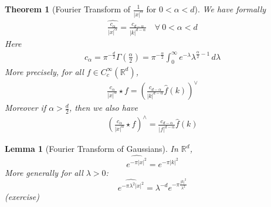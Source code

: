 \documentclass{report}
\theoremstyle{tommy}
\newtheorem{thm}[defn]{Theorem}
\newtheorem{lem}[defn]{Lemma}
\newtheorem{rem}[defn]{Remark}
\newcommand{\Rd}{\mathbb{R}^d}
\begin{document}
  
  \begin{thm}[Fourier Transform of \(\frac{1}{|x|^\alpha}\) for \(0 < \alpha < d\)] We have formally
    \begin{align*}
      \widehat{\frac{c_\alpha}{|x|^\alpha}} = \frac{c_{d-\alpha}}{|k|^{d - \alpha}} \quad \forall\ 0 < \alpha < d
    \end{align*}
    Here
    \begin{align*}
      c_\alpha = \pi^{- \frac{d}{2}} \Gamma \left(\frac{\alpha}{2} \right) = \pi^{- \frac{\alpha}{2}} \int_0^\infty e^{-\lambda} \lambda^{\frac{\alpha}{2}-1} \, d\lambda
    \end{align*}
    More precisely, for all \(f \in C_c^\infty(\mathbb{R}^d)\), 
    \begin{align*}
      \frac{c_\alpha}{|x|^\alpha}\star f = \left(\frac{c_{d-\alpha}}{|k|^{d - \alpha}} \hat f (k)\right)^\lor
    \end{align*}
    Moreover if \(\alpha > \frac{d}{2}\), then we also have
    \begin{align*}
      \left(\frac{c_\alpha}{|x|^\alpha} \star f\right)^\land = \frac{c_{d - \alpha}}{|f|^{d-\alpha}} \hat f (k)
    \end{align*}
  \end{thm}

  
  \begin{lem}[Fourier Transform of Gaussians] In \(\Rd\),
    \[\widehat{e^{- \pi |x|^2}} = e^{- \pi |k|^2}\]
    More generally for all \(\lambda > 0\):
    \[\widehat{e^{- \pi \lambda^2 |x|^2}} = \lambda^{-d} e^{-\pi \frac{|k|^2}{\lambda^2}}\]
    (exercise)
  \end{lem}
\end{document}
